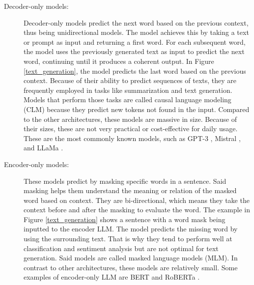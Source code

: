 \begin{description}

\item[Decoder-only models:] Decoder-only models predict the next word based on the previous context, thus being unidirectional models. The model achieves this by taking a text or prompt as input and returning  a first word. For each subsequent word, the model uses the previously generated text as input to predict the next word, continuing until it produces a coherent output. In Figure \ref{text_generation}, the model predicts the last word based on the previous context. Because of their ability to predict sequences of texts, they are frequently employed in tasks like summarization and text generation. Models that perform those tasks are called causal language modeling (CLM) because they predict new tokens not found in the input. Compared to the other architectures, these models are massive in size. Because of their sizes, these are not very practical or cost-effective for daily usage. These are the most commonly known models, such as GPT-3 \cite{DBLP:journals/corr/abs-2005-14165}, Mistral \cite{jiang2023mistral7b}, and LLaMa \cite{touvron2023llamaopenefficientfoundation}.

\item[Encoder-only models:] These models predict by masking specific words in a sentence. Said masking helps them understand the meaning or relation of the masked word based on context. They are bi-directional, which means they take the context before and after the masking to evaluate the word. The example in Figure \ref{text_generation} shows a sentence with a word mask being inputted to the encoder LLM. The model predicts the missing word by using the surrounding text. That is why they tend to perform well at classification and sentiment analysis but are not optimal for text generation. Said models are called masked language models (MLM). In contrast to other architectures, these models are relatively small. Some examples of encoder-only LLM are BERT \cite{DBLP:journals/corr/abs-1810-04805} and RoBERTa \cite{liu2019robertarobustlyoptimizedbert}.


\end{description}
